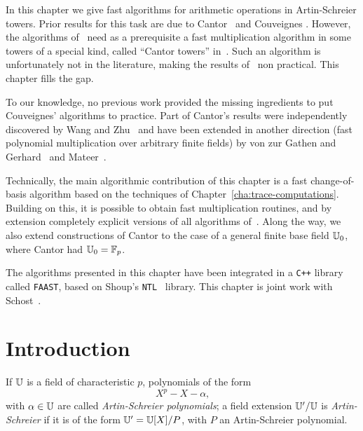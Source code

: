 

In this chapter we give fast algorithms for arithmetic operations in
Artin-Schreier towers. Prior results for this task are due to
Cantor~\cite{cantor89} and Couveignes \cite{couveignes00}. However,
the algorithms of~\cite{couveignes00} need as a prerequisite a fast
multiplication algorithm in some towers of a special kind, called
``Cantor towers'' in~\cite{couveignes00}. Such an algorithm is
unfortunately not in the literature, making the results
of~\cite{couveignes00} non practical. This chapter fills the gap.

To our knowledge, no previous work provided the missing ingredients to
put Couveignes' algorithms to practice. Part of Cantor's results were
independently discovered by Wang and Zhu~\cite{wang+zhu88} and have
been extended in another direction (fast polynomial multiplication
over arbitrary finite fields) by von zur Gathen and
Gerhard~\cite{vzgatehn+gerhard02} and Mateer~\cite{mateer08}.

Technically, the main algorithmic contribution of this chapter is a
fast chan\-ge-of-basis algorithm based on the techniques of
Chapter~\ref{cha:trace-computations}. Building on this, it is possible
to obtain fast multiplication routines, and by extension completely
explicit versions of all algorithms of~\cite{couveignes00}. Along the
way, we also extend constructions of Cantor to the case of a general
finite base field $\mathbb{U}_0$, where Cantor had $\mathbb{U}_0=\mathbb{F}_p$.

The algorithms presented in this chapter have been integrated in a
\texttt{C++} library called \texttt{FAAST}, based on Shoup's
\texttt{NTL}~\cite{shoup2003ntl} library. This chapter is joint work
with Schost~\cite{df+schost09}.


\section{Introduction}
\label{sec:artin-schr-extens}

If $\mathbb{U}$ is a field of characteristic $p$, polynomials of the form
\begin{equation}
  \label{eq:36}
  X^p - X - \alpha
  \text{,}  
\end{equation}
with $\alpha \in \mathbb{U}$ are called
\emph{Artin-Schreier polynomials}; a
field extension $\mathbb{U}'/\mathbb{U}$ is
\emph{Artin-Schreier} if it is of the
form $\mathbb{U}' = \mathbb{U}[X]/P$, with $P$ an Artin-Schreier polynomial.

